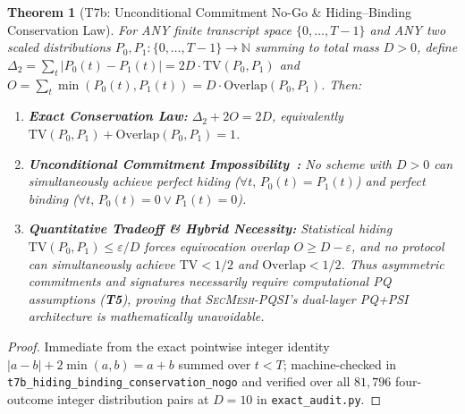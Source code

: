 \documentclass[11pt,reqno]{amsart}
\newtheorem{theorem}{Theorem}[section]
\theoremstyle{definition}
\newcommand{\code}[1]{\texttt{\small #1}}
\begin{document}
\begin{theorem}[T7b: Unconditional Commitment No-Go \& Hiding--Binding Conservation Law]
\label{thm:t7b}
For ANY finite transcript space $\{0,\dots,T-1\}$ and ANY two scaled distributions $P_0, P_1 : \{0,\dots,T-1\} \to \mathbb{N}$ summing to total mass $D > 0$, define $\Delta_2 = \sum_t |P_0(t) - P_1(t)| = 2D\cdot\mathrm{TV}(P_0,P_1)$ and $O = \sum_t \min(P_0(t), P_1(t)) = D\cdot\mathrm{Overlap}(P_0,P_1)$. Then:
\begin{enumerate}[leftmargin=1.8em]
  \item \textbf{Exact Conservation Law:} $\Delta_2 + 2O = 2D$, equivalently $\mathrm{TV}(P_0,P_1) + \mathrm{Overlap}(P_0,P_1) = 1$.
  \item \textbf{Unconditional Commitment Impossibility~\cite{mayers1997}:} No scheme with $D > 0$ can simultaneously achieve perfect hiding ($\forall t,\, P_0(t)=P_1(t)$) and perfect binding ($\forall t,\, P_0(t)=0 \lor P_1(t)=0$).
  \item \textbf{Quantitative Tradeoff \& Hybrid Necessity:} Statistical hiding $\mathrm{TV}(P_0,P_1) \le \varepsilon/D$ forces equivocation overlap $O \ge D - \varepsilon$, and no protocol can simultaneously achieve $\mathrm{TV} < 1/2$ and $\mathrm{Overlap} < 1/2$. Thus asymmetric commitments and signatures necessarily require computational PQ assumptions (\textbf{T5}), proving that \textsc{SecMesh-PQSI}'s dual-layer PQ+PSI architecture is mathematically unavoidable.
\end{enumerate}
\end{theorem}
\begin{proof}
Immediate from the exact pointwise integer identity $|a-b| + 2\min(a,b) = a + b$ summed over $t < T$; machine-checked in \code{t7b\_hiding\_binding\_conservation\_nogo} and verified over all $81{,}796$ four-outcome integer distribution pairs at $D=10$ in \code{exact\_audit.py}.
\end{proof}
\end{document}
